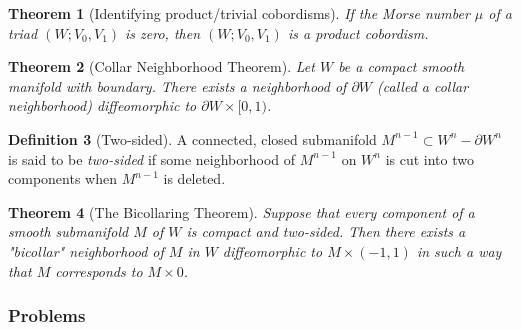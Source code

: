 \documentclass[reqno]{amsart}
\newtheorem{theorem}{Theorem}[section]
\theoremstyle{definition}
\newtheorem{definition}[theorem]{Definition}
\theoremstyle{remark}
\begin{document}
        \begin{theorem}[Identifying product/trivial cobordisms]
            If the Morse number $\mu$ of a triad
            $\left( W; V_0, V_1 \right) $ is zero, then
            $\left( W; V_0,V_1 \right) $ is a product cobordism.
        \end{theorem}

        \begin{theorem}[Collar Neighborhood Theorem]
            Let $W$ be a compact smooth manifold with
            boundary. There exists a neighborhood of
            $\partial W$ (called a collar neighborhood)
            diffeomorphic to 
            $\partial W \times [0,1)$.
        \end{theorem}

        \begin{definition}[Two-sided]
            A connected, closed submanifold
            $M^{n-1} \subset 
            W^{n} - \partial W^{n}$ is said to be
            \textit{two-sided} if some neighborhood
            of $M^{n-1}$ on $W^{n}$ is cut
            into two components when $M^{n-1}$ is deleted.
        \end{definition}


        \begin{theorem}[The Bicollaring Theorem]
            Suppose that every component of
            a smooth submanifold $M$ of $W$ is
            compact and two-sided. Then there
            exists a "bicollar" neighborhood of
            $M$ in $W$ diffeomorphic to
            $M \times (-1,1)$ in such a way that
            $M$ corresponds to
            $M \times 0$.
        \end{theorem}








        \newpage

        \subsubsection{Problems}
\end{document}
